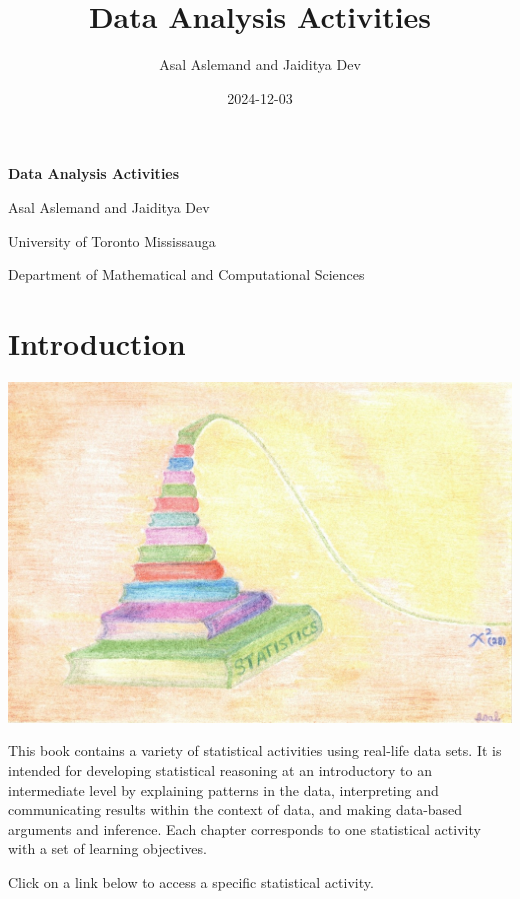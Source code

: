 \documentclass[oneside,openany]{book}
\title{Data Analysis Activities}
\author{Asal Aslemand and Jaiditya Dev}
\date{2024-12-03}
\begin{document}
\begin{titlepage}
    \centering
    {\Huge \bfseries Data Analysis Activities\par}
    \vspace{2cm}
    {\Large Asal Aslemand and Jaiditya Dev\par}
    {\Large University of Toronto Mississauga\par}
    {\Large Department of Mathematical and Computational Sciences}
    \vfill
\end{titlepage}

\newpage
{
\setcounter{tocdepth}{2}
\tableofcontents
}
\newpage
\chapter*{Introduction}


\begin{center}\includegraphics[width=0.65\linewidth]{Chi-square} \end{center}

This book contains a variety of statistical activities using real-life data sets. It is intended for developing statistical reasoning at an introductory to an intermediate level by explaining patterns in the data, interpreting and communicating results within the context of data, and making data-based arguments and inference. Each chapter corresponds to one statistical activity with a set of learning objectives.

Click on a link below to access a specific statistical activity.
\end{document}

